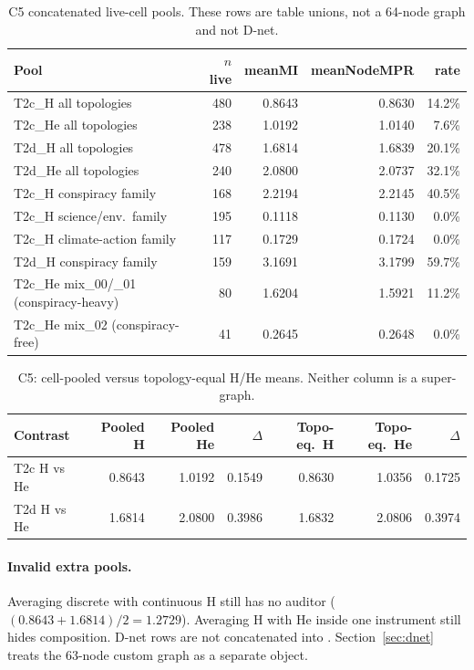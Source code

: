 \begin{table}[t]
\centering
\caption[C5 concatenated live-cell pools]{C5 concatenated live-cell pools.
These rows are table unions, not a 64-node graph and not D-net.}
\label{tab:c5pool}
\scriptsize
\begin{tabular}{lrrrr}
\toprule
Pool & $n$ live & meanMI & meanNodeMPR & \kstar{} rate \\
\midrule
T2c\_H all topologies & 480 & 0.8643 & 0.8630 & 14.2\% \\
T2c\_He all topologies & 238 & 1.0192 & 1.0140 & 7.6\% \\
T2d\_H all topologies & 478 & 1.6814 & 1.6839 & 20.1\% \\
T2d\_He all topologies & 240 & 2.0800 & 2.0737 & 32.1\% \\
T2c\_H conspiracy family & 168 & 2.2194 & 2.2145 & 40.5\% \\
T2c\_H science/env.\ family & 195 & 0.1118 & 0.1130 & 0.0\% \\
T2c\_H climate-action family & 117 & 0.1729 & 0.1724 & 0.0\% \\
T2d\_H conspiracy family & 159 & 3.1691 & 3.1799 & 59.7\% \\
T2c\_He mix\_00/\_01 (conspiracy-heavy) & 80 & 1.6204 & 1.5921 & 11.2\% \\
T2c\_He mix\_02 (conspiracy-free) & 41 & 0.2645 & 0.2648 & 0.0\% \\
\bottomrule
\end{tabular}
\end{table}

\begin{table}[t]
\centering
\caption[C5 cell-pooled versus topology-equal]{C5: cell-pooled versus topology-equal H/He means.
Neither column is a super-graph.}
\label{tab:c5w}
\begin{tabular}{lrrrrrr}
\toprule
Contrast & Pooled H & Pooled He & $\Delta$ & Topo-eq.\ H & Topo-eq.\ He & $\Delta$ \\
\midrule
T2c H vs He & 0.8643 & 1.0192 & 0.1549 & 0.8630 & 1.0356 & 0.1725 \\
T2d H vs He & 1.6814 & 2.0800 & 0.3986 & 1.6832 & 2.0806 & 0.3974 \\
\bottomrule
\end{tabular}
\end{table}

\paragraph{Invalid extra pools.}
Averaging discrete with continuous H still has no auditor ($(0.8643+1.6814)/2=1.2729$).
Averaging H with He inside one instrument still hides composition.
D-net rows are not concatenated into .
Section~\ref{sec:dnet} treats the 63-node custom graph as a separate object.
